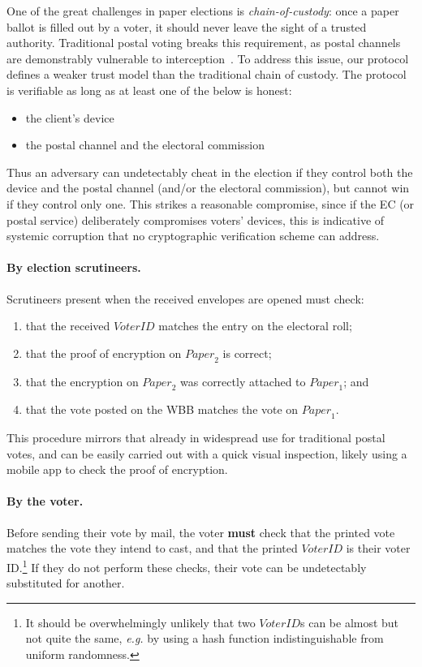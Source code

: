 \documentclass[12pt,a4paper]{article}
\theoremstyle{definition}
\newcommand{\VoterID}{\mathit{VoterID}}
\newcommand{\Paper}{\mathit{Paper}}
\newcommand{\eg}{\textit{e.g. }}
\begin{document}
One of the great challenges in paper elections is \textit{chain-of-custody}: once a paper ballot is filled out by a voter, it should never leave the sight of a trusted authority. Traditional postal voting breaks this requirement, as postal channels are demonstrably vulnerable to interception~\cite{stewart2010losing}. To address this issue, our protocol defines a weaker trust model than the traditional chain of custody. The protocol is verifiable as long as at least one of the below is honest:
\begin{itemize}
    \item the client's device
    \item the postal channel and the electoral commission
\end{itemize}
Thus an adversary can undetectably cheat in the election if they control both the device and the postal channel (and/or the electoral commission), but cannot win if they control only one. This strikes a reasonable compromise, since if the EC (or postal service) deliberately compromises voters' devices, this is indicative of systemic corruption that no cryptographic verification scheme can address.

\paragraph{By election scrutineers.} Scrutineers present when the received envelopes are opened must check:
\begin{enumerate}
    \item that the received $\VoterID$ matches the entry on the electoral roll;
    \item that the proof of encryption on $\Paper_2$ is correct;
    \item that the encryption on $\Paper_2$ was correctly attached to $\Paper_1$; and
    \item that the vote posted on the WBB matches the vote on $\Paper_1$.
\end{enumerate}
This procedure mirrors that already in widespread use for traditional postal votes, and can be easily carried out with a quick visual inspection, likely using a mobile app to check the proof of encryption.

\paragraph{By the voter.} Before sending their vote by mail, the voter \textbf{must} check that the printed vote matches the vote they intend to cast, and that the printed $\VoterID$ is their voter ID.\footnote{It should be overwhelmingly unlikely that two $\VoterID$s can be almost but not quite the same, \eg by using a hash function indistinguishable from uniform randomness.} If they do not perform these checks, their vote can be undetectably substituted for another.
\end{document}
